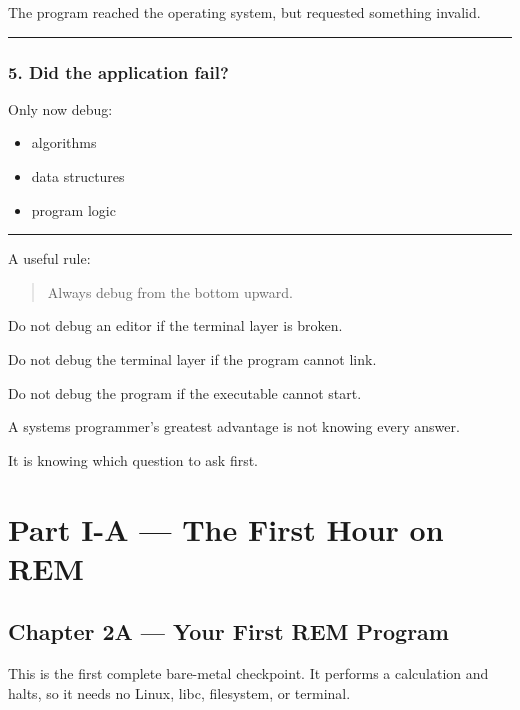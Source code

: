 \documentclass[
  oneside,
  openany]{book}
\providecommand{\tightlist}{%
  \setlength{\itemsep}{0pt}\setlength{\parskip}{0pt}}
\begin{document}
The program reached the operating system, but requested something
invalid.

\begin{center}\rule{0.5\linewidth}{0.5pt}\end{center}

\hypertarget{did-the-application-fail}{%
\section{5. Did the application fail?}\label{did-the-application-fail}}

Only now debug:

\begin{itemize}
\tightlist
\item
  algorithms
\item
  data structures
\item
  program logic
\end{itemize}

\begin{center}\rule{0.5\linewidth}{0.5pt}\end{center}

A useful rule:

\begin{quote}
Always debug from the bottom upward.
\end{quote}

Do not debug an editor if the terminal layer is broken.

Do not debug the terminal layer if the program cannot link.

Do not debug the program if the executable cannot start.

A systems programmer's greatest advantage is not knowing every answer.

It is knowing which question to ask first.

\part{Part I-A — The First Hour on REM}

\hypertarget{chapter-2a-your-first-rem-program}{%
\chapter{Chapter 2A --- Your First REM
Program}\label{chapter-2a-your-first-rem-program}}

This is the first complete bare-metal checkpoint. It performs a
calculation and halts, so it needs no Linux, libc, filesystem, or
terminal.
\end{document}
